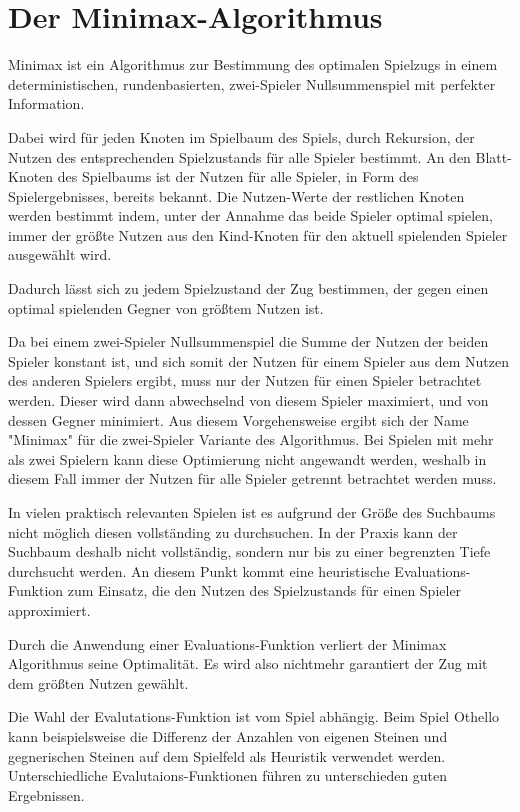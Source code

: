 \section{Der Minimax-Algorithmus}

Minimax ist ein Algorithmus zur Bestimmung des optimalen Spielzugs in einem deterministischen, rundenbasierten, zwei-Spieler Nullsummenspiel mit perfekter Information.

Dabei wird für jeden Knoten im Spielbaum des Spiels, durch Rekursion, der Nutzen des entsprechenden Spielzustands für alle Spieler bestimmt.
An den Blatt-Knoten des Spielbaums ist der Nutzen für alle Spieler, in Form des Spielergebnisses, bereits bekannt.
Die Nutzen-Werte der restlichen Knoten werden bestimmt indem, unter der Annahme das beide Spieler optimal spielen, immer der größte Nutzen aus den Kind-Knoten für den aktuell spielenden Spieler ausgewählt wird.
\cite[S.~165]{ai2010russel}

Dadurch lässt sich zu jedem Spielzustand der Zug bestimmen, der gegen einen optimal spielenden Gegner von größtem Nutzen ist.

Da bei einem zwei-Spieler Nullsummenspiel die Summe der Nutzen der beiden Spieler konstant ist, und sich somit der Nutzen für einem Spieler aus dem Nutzen des anderen Spielers ergibt, muss nur der Nutzen
für einen Spieler betrachtet werden. Dieser wird dann abwechselnd von diesem Spieler maximiert, und von dessen Gegner minimiert.
Aus diesem Vorgehensweise ergibt sich der Name "Minimax" für die zwei-Spieler Variante des Algorithmus.
Bei Spielen mit mehr als zwei Spielern kann diese Optimierung nicht angewandt werden, weshalb in diesem Fall immer der Nutzen für alle Spieler getrennt betrachtet werden muss.
\cite[S.~165]{ai2010russel}

In vielen praktisch relevanten Spielen ist es aufgrund der Größe des Suchbaums nicht möglich diesen vollständing zu durchsuchen.
In der Praxis kann der Suchbaum deshalb nicht vollständig, sondern nur bis zu einer begrenzten Tiefe durchsucht werden. An diesem Punkt kommt eine heuristische Evaluations-Funktion zum Einsatz,
die den Nutzen des Spielzustands für einen Spieler approximiert.
\cite[S.~171]{ai2010russel}

Durch die Anwendung einer Evaluations-Funktion verliert der Minimax Algorithmus seine Optimalität. Es wird also nichtmehr garantiert der Zug mit dem größten Nutzen gewählt.

Die Wahl der Evalutations-Funktion ist vom Spiel abhängig. Beim Spiel Othello kann beispielsweise die Differenz der Anzahlen von eigenen Steinen und gegnerischen Steinen auf dem Spielfeld als Heuristik verwendet werden.
Unterschiedliche Evalutaions-Funktionen führen zu unterschieden guten Ergebnissen.

